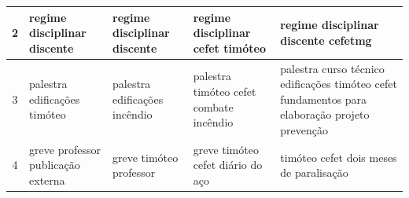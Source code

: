 \begin{center}
\begin{longtable}{c|p{3cm}|p{3cm}|p{3cm}|p{3cm}}
2 & regime disciplinar discente & regime disciplinar discente & 
regime disciplinar \newline\newline
cefet \newline
timóteo
 & 
regime disciplinar discente \newline
cefetmg
 \\ \hline

3 & 
palestra \newline
edificações \newline\newline
timóteo \newline
 \newline
2010
 & 
palestra\newline
edificações\newline\newline
\newline
\newline
\newline
incêndio
  & 
palestra\newline
\newline\newline
timóteo\newline
cefet\newline
\newline
combate incêndio
  & 
palestra\newline
curso técnico edificações\newline
timóteo\newline
cefet\newline
\newline
fundamentos para elaboração projeto prevenção
 \\ \hline

4 &
greve\newline
\newline
professor\newline
\newline
publicação externa\newline
2012
 &
greve\newline
timóteo\newline
professor
 &
greve\newline
timóteo\newline
\newline
cefet\newline
\newline\newline
\newline
diário do aço
 &
timóteo\newline
\newline\newline
cefet\newline
\newline
\newline\newline
\newline
dois meses de paralisação
 \\\hline


\end{longtable}
\end{center}

